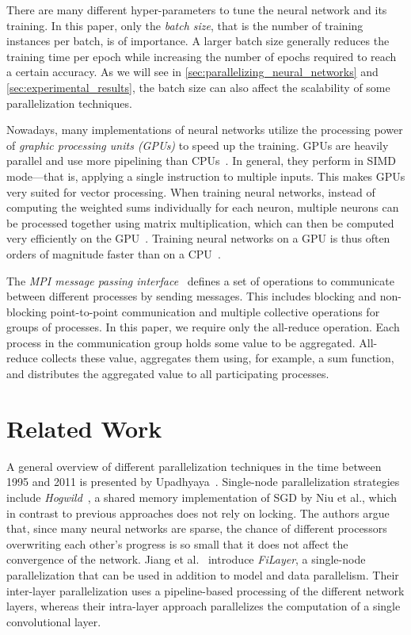 \documentclass[conference]{IEEEtran}
\begin{document}
There are many different hyper-parameters to tune the neural network and its training.
In this paper, only the \emph{batch size}, that is the number of training instances per batch, is of importance.
A larger batch size generally reduces the training time per epoch while increasing the number of epochs required to reach a certain accuracy.
As we will see in \autoref{sec:parallelizing_neural_networks} and \ref{sec:experimental_results}, the batch size can also affect the scalability of some parallelization techniques.

Nowadays, many implementations of neural networks utilize the processing power of \emph{graphic processing units (GPUs)} to speed up the training.
GPUs are heavily parallel and use more pipelining than CPUs~\cite{oh2004gpu}.
In general, they perform in SIMD mode---that is, applying a single instruction to multiple inputs.
This makes GPUs very suited for vector processing.
%
When training neural networks, instead of computing the weighted sums individually for each neuron, multiple neurons can be processed together using matrix multiplication, which can then be computed very efficiently on the GPU~\cite{oh2004gpu}.
Training neural networks on a GPU is thus often orders of magnitude faster than on a CPU~\cite{oh2004gpu,strigl2010performance}.

The \emph{MPI message passing interface}~\cite{walker1996mpi} defines a set of operations to communicate between different processes by sending messages.
This includes blocking and non-blocking point-to-point communication and multiple collective operations for groups of processes.
In this paper, we require only the all-reduce operation.
Each process in the communication group holds some value to be aggregated.
All-reduce collects these value, aggregates them using, for example, a sum function, and distributes the aggregated value to all participating processes.


\section{Related Work} %
\label{sec:related_work}
A general overview of different parallelization techniques in the time between 1995 and 2011 is presented by Upadhyaya~\cite{upadhyaya2013parallel}.
%
Single-node parallelization strategies include \emph{Hogwild}~\cite{recht2011-Hogwild}, a shared memory implementation of SGD by Niu et al., which in contrast to previous approaches does not rely on locking.
The authors argue that, since many neural networks are sparse, the chance of different processors overwriting each other's progress is so small that it does not affect the convergence of the network.
%
Jiang et al.~\cite{jiang2018-FiLayer} introduce \emph{FiLayer}, a single-node parallelization that can be used in addition to model and data parallelism.
Their inter-layer parallelization uses a pipeline-based processing of the different network layers, whereas their intra-layer approach parallelizes the computation of a single convolutional layer.
\end{document}
